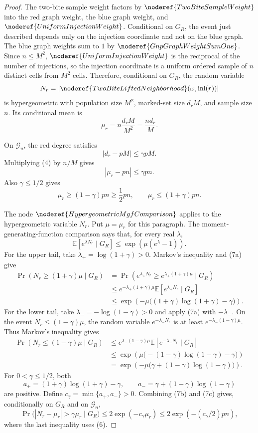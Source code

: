 \begin{proof}
The two-bite sample weight factors by \(\noderef{TwoBiteSampleWeight}\) into
the red graph weight, the blue graph weight, and
\(\noderef{UniformInjectionWeight}\).  Conditional on \(G_R\), the event just
described depends only on the injection coordinate and not on the blue graph.
The blue graph weights sum to \(1\) by \(\noderef{GnpGraphWeightSumOne}\).
Since \(n\le M^2\), \(\noderef{UniformInjectionWeight}\) is the reciprocal of
the number of injections, so the injection coordinate is a uniform ordered
sample of \(n\) distinct cells from \(M^2\) cells.  Therefore, conditional on
\(G_R\), the random variable
\[
N_r=|\noderef{TwoBiteLiftedNeighborhood}(\omega,\operatorname{inl}(r))|
\]
is hypergeometric with population size \(M^2\), marked-set size \(d_rM\), and
sample size \(n\).  Its conditional mean is
\[
\mu_r=n\frac{d_rM}{M^2}=\frac{nd_r}{M}.
\tag{3}
\]

On \(\mathcal G_n\), the red degree satisfies
\[
|d_r-pM|\le \gamma pM.
\tag{4}
\]
Multiplying (4) by \(n/M\) gives
\[
|\mu_r-pn|\le \gamma pn.
\tag{5}
\]
Also \(\gamma\le1/2\) gives
\[
\mu_r\ge(1-\gamma)pn\ge \frac12 pn,
\qquad
\mu_r\le(1+\gamma)pn.
\tag{6}
\]

The node \(\noderef{HypergeometricMgfComparison}\) applies to the
hypergeometric variable \(N_r\).  Put \(\mu=\mu_r\) for this paragraph.  The
moment-generating-function comparison says that, for every real \(\lambda\),
\[
\mathbb E\!\left[e^{\lambda N_r}\mid G_R\right]
\le \exp\!\left(\mu(e^\lambda-1)\right).
\tag{7a}
\]
For the upper tail, take \(\lambda_+=\log(1+\gamma)>0\).  Markov's
inequality and (7a) give
\[
\begin{aligned}
\Pr(N_r\ge(1+\gamma)\mu\mid G_R)
&=\Pr(e^{\lambda_+N_r}\ge e^{\lambda_+(1+\gamma)\mu}\mid G_R)\\
&\le e^{-\lambda_+(1+\gamma)\mu}
   \mathbb E[e^{\lambda_+N_r}\mid G_R]\\
&\le
\exp\!\left(
  -\mu\bigl((1+\gamma)\log(1+\gamma)-\gamma\bigr)
\right).
\end{aligned}
\tag{7b}
\]
For the lower tail, take \(\lambda_-=-\log(1-\gamma)>0\) and apply (7a) with
\(-\lambda_-\).  On the event \(N_r\le(1-\gamma)\mu\), the random variable
\(e^{-\lambda_-N_r}\) is at least
\(e^{-\lambda_-(1-\gamma)\mu}\).  Thus Markov's inequality gives
\[
\begin{aligned}
\Pr(N_r\le(1-\gamma)\mu\mid G_R)
&\le e^{\lambda_-(1-\gamma)\mu}
   \mathbb E[e^{-\lambda_-N_r}\mid G_R]\\
&\le
\exp\!\left(
  \mu\bigl(-(1-\gamma)\log(1-\gamma)-\gamma\bigr)
\right)\\
&=
\exp\!\left(
  -\mu\bigl(\gamma+(1-\gamma)\log(1-\gamma)\bigr)
\right).
\end{aligned}
\tag{7c}
\]
For \(0<\gamma\le1/2\), both
\[
a_+=(1+\gamma)\log(1+\gamma)-\gamma,
\qquad
a_-=\gamma+(1-\gamma)\log(1-\gamma)
\]
are positive.  Define \(c_\gamma=\min\{a_+,a_-\}>0\).  Combining (7b) and
(7c) gives, conditionally on \(G_R\) and on \(\mathcal G_n\),
\[
\Pr\bigl(|N_r-\mu_r|>\gamma\mu_r\mid G_R\bigr)
\le 2\exp(-c_\gamma\mu_r)
\le 2\exp(-(c_\gamma/2)pn),
\tag{7}
\]
where the last inequality uses (6).


\end{proof}
